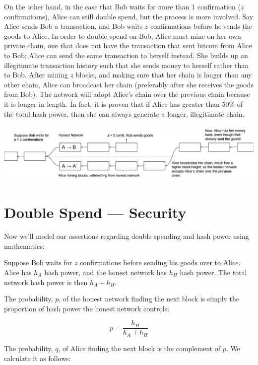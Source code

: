 \documentclass[full.tex]{subfiles}
\begin{document}
  On the other hand, in the case that Bob waits for more than 1 confirmation ($z$ confirmations), Alice can still double spend, but the process is more involved. Say Alice sends Bob a transaction, and Bob waits $z$ confirmations before he sends the goods to Alice. In order to double spend on Bob, Alice must mine on her own private chain, one that does not have the transaction that sent bitcoin from Alice to Bob; Alice can send the same transaction to herself instead. She builds up an illegitimate transaction history such that she sends money to herself rather than to Bob. After mining $z$ blocks, and making sure that her chain is longer than any other chain, Alice can broadcast her chain (preferably after she receives the goods from Bob). The network will adopt Alice's chain over the previous chain because it is longer in length. In fact, it is proven that if Alice has greater than 50\% of the total hash power, then she can always generate a longer, illegitimate chain. \\ \\
 
   \includegraphics[scale=0.3]{z_confirmation} \\
   
   \section*{Double Spend --- Security}
   
   Now we'll model our assertions regarding double spending and hash power using mathematics:
   
   Suppose Bob waits for $z$ confirmations before sending his goods over to Alice. Alice has $h_A$ hash power, and the honest network has $h_H$ hash power. The total network hash power is then $h_A + h_H$. 
   
   The probability, $p$, of the honest network finding the next block is simply the proportion of hash power the honest network controls:
   
   $$p = \frac{h_H}{h_A + h_H} $$
   
   The probability, $q$, of Alice finding the next block is the complement of $p$. We calculate it as follows:
   
\end{document}
